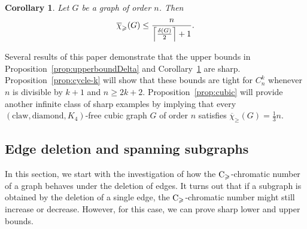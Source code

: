 \documentclass{article}
\newtheorem{corollary}[theorem]{Corollary}
\theoremstyle{definition}
\newcommand{\mc}{\overline{\chi}_{\geqslant}}
\newcommand{\cg}{{\rm C}_{\geqslant}}
\begin{document}
\begin{corollary}
     Let $G$ be a graph of order $n$. Then $$\mc(G)\le \frac{n}{\Bigl\lceil \frac{\delta(G)}{2}\Bigr\rceil +1}.$$ 
    \label{col:upperbounddelta}
\end{corollary}
Several results of this paper demonstrate that the upper bounds in Proposition~\ref{prop:upperboundDelta} and Corollary~\ref{col:upperbounddelta} are sharp. Proposition~\ref{prop:cycle-k} will show that these bounds are tight for $C_n^k$ whenever $n$ is divisible by $k+1$ and $n \ge 2k+2$. Proposition~\ref{prop:cubic} will provide another infinite class of sharp examples by implying that every $(\text{claw}, \text{diamond}, K_4)$-free cubic graph $G$ of order $n$ satisfies $\mc(G) = \frac{1}{3}n$. 

\subsection{Edge deletion and spanning subgraphs}

In this section, we start with the investigation of how the $\cg$-chromatic number of a graph behaves under the deletion of edges.
It turns out that if a subgraph is obtained by the deletion of a single edge,  the $\cg$-chromatic number might still increase or decrease. However, for this case, we can prove sharp lower and upper bounds.
\end{document}
